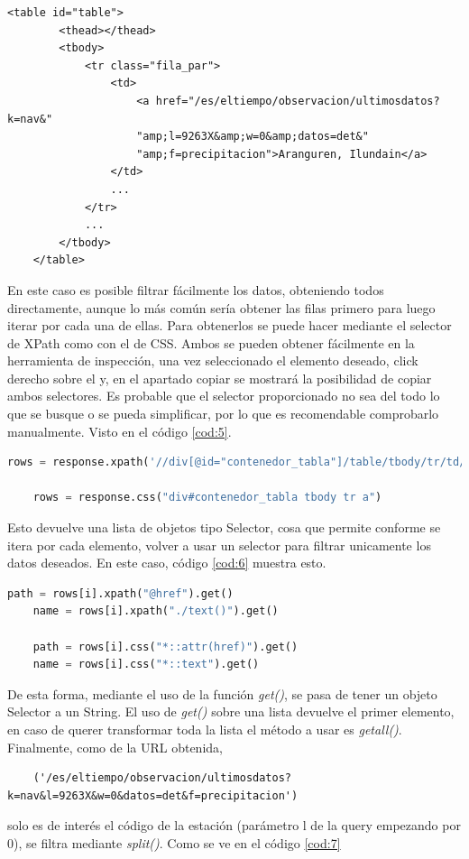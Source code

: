 \begin{lstlisting}[caption={Estructura HTML de los datos deseados Aemet. Los puntos suspensivos de las líneas 10 y 12 representan código omitido.}, label=cod:4]
	<table id="table">
		<thead></thead>
		<tbody>
			<tr class="fila_par">
				<td>
					<a href="/es/eltiempo/observacion/ultimosdatos?k=nav&"
					"amp;l=9263X&amp;w=0&amp;datos=det&"
					"amp;f=precipitacion">Aranguren, Ilundain</a>
				</td>
				...
			</tr>
			...
		</tbody>
	</table>
\end{lstlisting}

En este caso es posible filtrar fácilmente los datos, obteniendo todos directamente, aunque lo más común sería obtener las filas primero para luego iterar por cada una de ellas. Para obtenerlos se puede hacer mediante el selector de XPath como con el de CSS.\newline
\newline
Ambos se pueden obtener fácilmente en la herramienta de inspección, una vez seleccionado el elemento deseado, click derecho sobre el y, en el apartado copiar se mostrará la posibilidad de copiar ambos selectores. Es probable que el selector proporcionado no sea del todo lo que se busque o se pueda simplificar, por lo que es recomendable comprobarlo manualmente. Visto en el código \ref{cod:5}.

\begin{lstlisting}[language=Python, caption={Selectores posibles para la obtención de los datos de código y nombre de estación en Aemet}, label=cod:5]
	rows = response.xpath('//div[@id="contenedor_tabla"]/table/tbody/tr/td/a')
	
	rows = response.css("div#contenedor_tabla tbody tr a")
\end{lstlisting}

Esto devuelve una lista de objetos tipo Selector, cosa que permite conforme se itera por cada elemento, volver a usar un selector para filtrar unicamente los datos deseados. En este caso, código \ref{cod:6} muestra esto.

\begin{lstlisting}[language=Python, caption={Selectores posibles para el filtrado de los datos de código y nombre de estación en Aemet}, label=cod:6]
	path = rows[i].xpath("@href").get()
	name = rows[i].xpath("./text()").get()
	
	path = rows[i].css("*::attr(href)").get()
	name = rows[i].css("*::text").get()
\end{lstlisting}

De esta forma, mediante el uso de la función \textit{get()}, se pasa de tener un objeto Selector a un String. El uso de \textit{get()} sobre una lista devuelve el primer elemento, en caso de querer transformar toda la lista el método a usar es \textit{getall()}.\newline
\newline
Finalmente, como de la URL obtenida,
\begin{verbatim}
	('/es/eltiempo/observacion/ultimosdatos?k=nav&l=9263X&w=0&datos=det&f=precipitacion')
\end{verbatim}
solo es de interés el código de la estación (parámetro l de la query empezando por 0), se filtra mediante \textit{split()}. Como se ve en el código \ref{cod:7}

